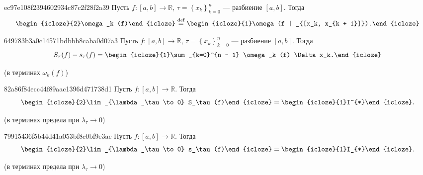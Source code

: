 \begin{note}{ec97e108f2394602934c87c2f28f2a39}
    Пусть \({ f : \left[ a, b \right] \to \mathbb R }\),\: \({ \tau = \left\{ x_k \right\}_{k = 0}^{n} }\) --- разбиение \({ \left[ a, b \right] }\).
    Тогда
    \[
        \begin{icloze}{2}\omega_k (f)\end{icloze} \overset{\text{def}}= \begin{icloze}{1}\omega (f | _{[x_k, x_{k + 1}]}).\end{icloze}
    \]
\end{note}

\begin{note}{649783b3a0c14571bdbbb8caba0d07a3}
    Пусть \({ f : \left[ a, b \right] \to \mathbb R }\),\: \({ \tau = \left\{ x_k \right\}_{k = 0}^{n} }\) --- разбиение \({ \left[ a, b \right] }\).
    Тогда
    \[
        S_\tau (f) - s_\tau (f) = \begin{icloze}{1}\sum_{k=0}^{n - 1} \omega_k (f) \Delta x_k.\end{icloze}
    \]

    \begin{center}
        \tiny
        (в терминах \({ \omega_k (f) }\))
    \end{center}
\end{note}

\begin{note}{82a86f84ecc44f89aac1396d471738d1}
    Пусть \({ f : \left[ a, b \right] \to \mathbb R }\). Тогда
    \[
        \begin{icloze}{2}\lim_{\lambda_\tau \to 0} S_\tau (f)\end{icloze} = \begin{icloze}{1}I^{*}\end{icloze}.
    \]

    \begin{center}
        \tiny
        (в терминах предела при \({ \lambda_\tau \to 0 }\))
    \end{center}
\end{note}

\begin{note}{79915436f5b44d41a053bf8c0bf9e3ac}
    Пусть \({ f : \left[ a, b \right] \to \mathbb R }\). Тогда
    \[
        \begin{icloze}{2}\lim_{\lambda_\tau \to 0} s_\tau (f)\end{icloze} = \begin{icloze}{1}I_{*}\end{icloze}.
    \]

    \begin{center}
        \tiny
        (в терминах предела при \({ \lambda_\tau \to 0 }\))
    \end{center}
\end{note}

